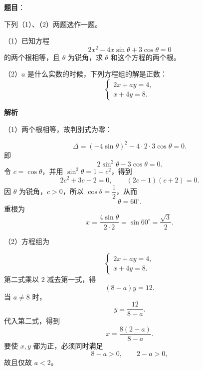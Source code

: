 \begin{answer}

\textbf{题目}：

下列（1）、（2）两题选作一题。

（1）已知方程
\nopagebreak[4]
\[
2x^2-4x\sin\theta+3\cos\theta=0
\]
的两个根相等，且 $\theta$ 为锐角，求 $\theta$ 和这个方程的两个根。

（2）$a$ 是什么实数的时候，下列方程组的解是正数：
\nopagebreak[4]
\[
\begin{cases}
2x+ay=4,\\
x+4y=8.
\end{cases}
\]

\textbf{解析}

（1）两个根相等，故判别式为零：

\nopagebreak[4]
\[
\Delta=(-4\sin\theta)^2-4\cdot2\cdot3\cos\theta=0.
\]
即
\nopagebreak[4]
\[
2\sin^2\theta-3\cos\theta=0.
\]
令 $c=\cos\theta$，并用 $\sin^2\theta=1-c^2$，得到
\nopagebreak[4]
\[
2c^2+3c-2=0,
\qquad (2c-1)(c+2)=0.
\]
因 $\theta$ 为锐角，$c>0$，所以 $\cos\theta=\dfrac12$，从而
\nopagebreak[4]
\[
\theta=60^\circ.
\]
重根为
\nopagebreak[4]
\[
x=\frac{4\sin\theta}{2\cdot2}=\sin60^\circ=\frac{\sqrt3}{2}.
\]

（2）方程组为

\nopagebreak[4]
\[
\begin{cases}
2x+ay=4,\\
x+4y=8.
\end{cases}
\]
第二式乘以 $2$ 减去第一式，得
\nopagebreak[4]
\[
(8-a)y=12.
\]
当 $a\ne8$ 时，
\nopagebreak[4]
\[
y=\frac{12}{8-a}.
\]
代入第二式，得到
\nopagebreak[4]
\[
x=\frac{8(2-a)}{8-a}.
\]
要使 $x,y$ 都为正，必须同时满足
\nopagebreak[4]
\[
8-a>0,\qquad 2-a>0,
\]
故且仅故 $a<2$。


\end{answer}